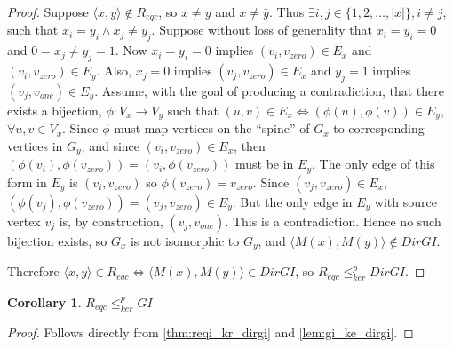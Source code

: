 \documentclass{article}
\newtheorem{corollary}[corollary]{Corollary}
\theoremstyle{definition} \newtheorem{definition}[definition]{Definition}
\newcommand{\kr}{\leq^{p}_{ker}} %
\newcommand{\pair}[2]{\langle#1,#2\rangle} %
\begin{document}
\begin{proof}
  Suppose $\pair{x}{y}\notin R_{eqc}$, so $x\neq y$ and $x\neq\bar{y}$. Thus
  $\exists i,j\in\{1,2,\ldots,|x|\}, i\neq j,$ such that $x_i=y_i\land x_j\neq
  y_j$. Suppose without loss of generality that $x_i=y_i=0$ and $0=x_j\neq
  y_j=1$. Now $x_i=y_i=0$ implies $(v_i, v_{zero})\in E_x$ and $(v_i,
  v_{zero})\in E_y$. Also, $x_j=0$ implies $(v_j, v_{zero})\in E_x$ and $y_j=1$
  implies $(v_j, v_{one})\in E_y$. Assume, with the goal of producing a
  contradiction, that there exists a bijection, $\phi\colon V_x\to V_y$ such
  that $(u,v)\in E_x\iff(\phi(u),\phi(v))\in E_y$, $\forall u,v\in V_x$. Since
  $\phi$ must map vertices on the ``spine'' of $G_x$ to corresponding vertices
  in $G_y$, and since $(v_i, v_{zero})\in E_x$, then $(\phi(v_i),
  \phi(v_{zero}))=(v_i, \phi(v_{zero}))$ must be in $E_y$. The only edge of
  this form in $E_y$ is $(v_i, v_{zero})$ so $\phi(v_{zero})=v_{zero}$. Since
  $(v_j, v_{zero})\in E_x$, $(\phi(v_j), \phi(v_{zero}))=(v_j, v_{zero})\in
  E_y$. But the only edge in $E_y$ with source vertex $v_j$ is, by
  construction, $(v_j, v_{one})$. This is a contradiction. Hence no such
  bijection exists, so $G_x$ is not isomorphic to $G_y$, and
  $\pair{M(x)}{M(y)}\notin DirGI$.

  Therefore $\pair{x}{y}\in R_{eqc} \iff \pair{M(x)}{M(y)}\in DirGI$, so
  $R_{eqc}\kr DirGI$.
\end{proof}

\begin{corollary}$R_{eqc}\kr GI$\end{corollary}
\begin{proof}Follows directly from \autoref{thm:reqi_kr_dirgi} and
  \autoref{lem:gi_ke_dirgi}.\end{proof}
\end{document}

